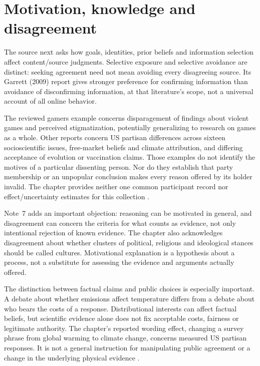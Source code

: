 \section{Motivation, knowledge and disagreement}
\label{sec:p18-r143-motivations}

The source next asks how goals, identities, prior beliefs and information
selection affect content/source judgments. Selective exposure and selective
avoidance are distinct: seeking agreement need not mean avoiding every
disagreeing source. Its Garrett (2009) report gives stronger preference for
confirming information than avoidance of disconfirming information, at
that literature's scope, not a universal account of all online behavior.

The reviewed gamers example concerns disparagement of findings about
violent games and perceived stigmatization, potentially generalizing to
research on games as a whole. Other reports concern US partisan differences
across sixteen socioscientific issues, free-market beliefs and climate
attribution, and differing acceptance of evolution or vaccination claims.
Those examples do not identify the motives of a particular dissenting
person. Nor do they establish that party membership or an unpopular
conclusion makes every reason offered by its holder invalid. The chapter
provides neither one common participant record nor effect/uncertainty
estimates for this collection \cite[pp.~771--772]{BrommeGierth2021PublicScience}.

Note~7 adds an important objection: reasoning can be motivated in general,
and disagreement can concern the criteria for what counts as evidence,
not only intentional rejection of known evidence. The chapter also
acknowledges disagreement about whether clusters of political, religious
and ideological stances should be called cultures. Motivational explanation
is a hypothesis about a process, not a substitute for assessing the
evidence and arguments actually offered.

The distinction between factual claims and public choices is especially
important. A debate about whether emissions affect temperature differs
from a debate about who bears the costs of a response. Distributional
interests can affect factual beliefs, but scientific evidence alone does
not fix acceptable costs, fairness or legitimate authority. The chapter's
reported wording effect, changing a survey phrase from global warming to
climate change, concerns measured US partisan responses. It is not a
general instruction for manipulating public agreement or a change in
the underlying physical evidence \cite[pp.~771--772 and note~7]{BrommeGierth2021PublicScience}.

